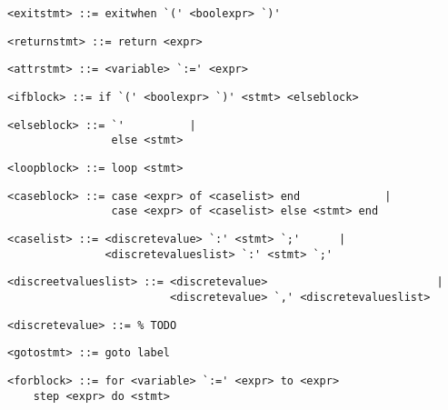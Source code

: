 \begin{footnotesize}
\begin{lstlisting}[frame=single]
<exitstmt> ::= exitwhen `(' <boolexpr> `)'
\end{lstlisting}

\begin{lstlisting}[frame=single]
<returnstmt> ::= return <expr>
\end{lstlisting}

\begin{lstlisting}[frame=single]
<attrstmt> ::= <variable> `:=' <expr>
\end{lstlisting}

\begin{lstlisting}[frame=single]
<ifblock> ::= if `(' <boolexpr> `)' <stmt> <elseblock> 
\end{lstlisting}


\begin{lstlisting}[frame=single]
<elseblock> ::= `'          |
                else <stmt>
\end{lstlisting}

\begin{lstlisting}[frame=single]
<loopblock> ::= loop <stmt>
\end{lstlisting}

\begin{lstlisting}[frame=single]
<caseblock> ::= case <expr> of <caselist> end             |
                case <expr> of <caselist> else <stmt> end
\end{lstlisting}

\begin{lstlisting}[frame=single]
<caselist> ::= <discretevalue> `:' <stmt> `;'      |
               <discretevalueslist> `:' <stmt> `;'
\end{lstlisting}

\begin{lstlisting}[frame=single]
<discreetvalueslist> ::= <discretevalue>                          |
                         <discretevalue> `,' <discretevalueslist>
\end{lstlisting}

\begin{lstlisting}[frame=single]
<discretevalue> ::= % TODO
\end{lstlisting}

\begin{lstlisting}[frame=single]
<gotostmt> ::= goto label
\end{lstlisting}

\begin{lstlisting}[frame=single]
<forblock> ::= for <variable> `:=' <expr> to <expr>
    step <expr> do <stmt>
\end{lstlisting}


\end{footnotesize}
